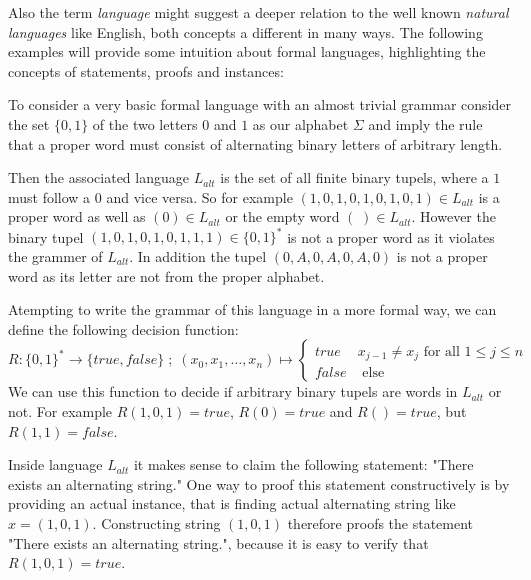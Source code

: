 Also the term \textit{language} might suggest a deeper relation to the well known \textit{natural languages} like English, both concepts a different in many ways. The following examples will provide some intuition about formal languages, highlighting the concepts of statements, proofs and instances:
\begin{example} To consider a very basic formal language with an almost trivial grammar consider the set $\{0,1\}$ of the two letters $0$ and $1$ as our alphabet $\Sigma$ and imply the rule that a proper word must consist of alternating binary letters of arbitrary length. 

Then the associated language $L_{alt}$ is the set of all finite binary tupels, where a $1$ must follow a $0$ and vice versa. So for example $(1,0,1,0,1,0,1,0,1)\in L_{alt}$ is a proper word as well as $(0)\in L_{alt}$ or the empty word $(\;)\in L_{alt}$. However the binary tupel $(1,0,1,0,1,0,1,1,1)\in \{0,1\}^*$ is not a proper word as it violates the grammer of $L_{alt}$. In addition the tupel $(0,A,0,A,0,A,0)$ is not a proper word as its letter are not from the proper alphabet. 

Atempting to write the grammar of this language in a more formal way, we can define the following decision function:
$$
R: \{0,1\}^* \to \{true,false\}\;;\; (x_0,x_1,\ldots,x_n) \mapsto 
\begin{cases}
true & x_{j-1} \neq x_{j} \text{ for all } 1\leq j \leq n \\
false & \text{ else}
\end{cases}
$$
We can use this function to decide if arbitrary binary tupels are words in $L_{alt}$ or not. For example $R(1,0,1)=true$, $R(0)=true$ and $R()=true$, but $R(1,1)=false $.

Inside language $L_{alt}$ it makes sense to claim the following statement: "There exists an alternating string." One way to proof this statement constructively is by providing an actual instance, that is finding actual alternating string like $x = (1,0,1)$. Constructing string $(1,0,1)$ therefore proofs the statement "There exists an alternating string.", because it is easy to verify that $R(1,0,1)=true$.
\end{example}
